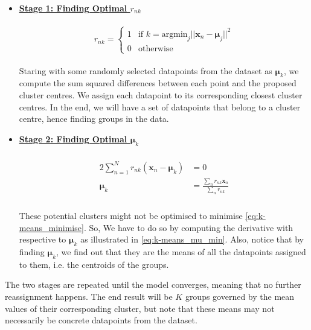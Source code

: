 \newpage
\begin{itemize}
  \item \textbf{\underline{Stage 1: Finding Optimal $r_{nk}$}} \\ \\
	\begin{equation} \label{eq:k-means_r_nk}
		r_{nk} =
		\begin{cases}
			1 & \text{if } k=\mathrm{argmin}_j ||\mathbf{x}_n - \mathbf{\mu}_j||^2\\
			0 & \text{otherwise}
		\end{cases}
  \end{equation} \\
	
  Staring with some randomly selected datapoints from the dataset as $\mathbf{\mu}_k$, we compute the sum squared differences between each point and the proposed cluster centres. We assign each datapoint to its corresponding closest cluster centres. In the end, we will have a set of datapoints that belong to a cluster centre, hence finding groups in the data.
\\
  \item \textbf{\underline{Stage 2: Finding Optimal $\mathbf{\mu}_k$}} \\ \\ 
    \begin{align} \label{eq:k-means_mu_min}
    \begin{split}
    2\sum_{n=1}^{N}r_{nk}(\mathbf{x}_n - \mathbf{\mu}_k) &=  0 \\ 
    \mathbf{\mu}_k &= \frac{\sum_n r_{nk}\mathbf{x}_n}{\sum_n r_{nk}}
    \end{split}
	\end{align} \\
  
  These potential clusters might not be optimised to minimise \autoref{eq:k-means_minimise}. So, We have to do so by computing the derivative with respective to $\mathbf{\mu}_k$ as illustrated in \autoref{eq:k-means_mu_min}. Also, notice that by finding $\mathbf{\mu}_k$, we find out that they are the means of all the datapoints assigned to them, i.e. the centroids of the groups.
\end{itemize}

The two stages are repeated until the model converges, meaning that no further reassignment happens. The end result will be $K$ groups governed by the mean values of their corresponding cluster, but note that these means may not necessarily be concrete datapoints from the dataset. 

